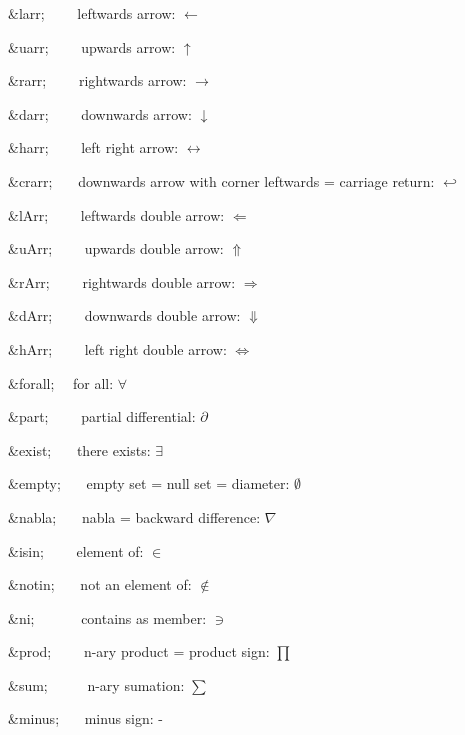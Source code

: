 \begin{DoxyItemize}
\item {\ttfamily \&larr;}{\ttfamily ~~~~} leftwards arrow\+: {$\leftarrow$} 
\item {\ttfamily \&uarr;}{\ttfamily ~~~~} upwards arrow\+: {$\uparrow$} 
\item {\ttfamily \&rarr;}{\ttfamily ~~~~} rightwards arrow\+: {$\rightarrow$} 
\item {\ttfamily \&darr;}{\ttfamily ~~~~} downwards arrow\+: {$\downarrow$} 
\item {\ttfamily \&harr;}{\ttfamily ~~~~} left right arrow\+: {$\leftrightarrow$} 
\item {\ttfamily \&crarr;}{\ttfamily ~~~} downwards arrow with corner leftwards = carriage return\+: {$\hookleftarrow$} 
\item {\ttfamily \&l\+Arr;}{\ttfamily ~~~~} leftwards double arrow\+: {$\Leftarrow$} 
\item {\ttfamily \&u\+Arr;}{\ttfamily ~~~~} upwards double arrow\+: {$\Uparrow$} 
\item {\ttfamily \&r\+Arr;}{\ttfamily ~~~~} rightwards double arrow\+: {$\Rightarrow$} 
\item {\ttfamily \&d\+Arr;}{\ttfamily ~~~~} downwards double arrow\+: {$\Downarrow$} 
\item {\ttfamily \&h\+Arr;}{\ttfamily ~~~~} left right double arrow\+: {$\Leftrightarrow$} 
\item {\ttfamily \&forall;}{\ttfamily ~~} for all\+: {$\forall$} 
\item {\ttfamily \&part;}{\ttfamily ~~~~} partial differential\+: {$\partial$} 
\item {\ttfamily \&exist;}{\ttfamily ~~~} there exists\+: {$\exists$} 
\item {\ttfamily \&empty;}{\ttfamily ~~~} empty set = null set = diameter\+: {$\emptyset$} 
\item {\ttfamily \&nabla;}{\ttfamily ~~~} nabla = backward difference\+: {$\nabla$} 
\item {\ttfamily \&isin;}{\ttfamily ~~~~} element of\+: {$\in$} 
\item {\ttfamily \&notin;}{\ttfamily ~~~} not an element of\+: {$\notin$} 
\item {\ttfamily \&ni;}{\ttfamily ~~~~~~} contains as member\+: {$\ni$} 
\item {\ttfamily \&prod;}{\ttfamily ~~~~} n-\/ary product = product sign\+: {$\prod$} 
\item {\ttfamily \&sum;}{\ttfamily ~~~~~} n-\/ary sumation\+: {$\sum$} 
\item {\ttfamily \&minus;}{\ttfamily ~~~} minus sign\+: - 

\end{DoxyItemize}

